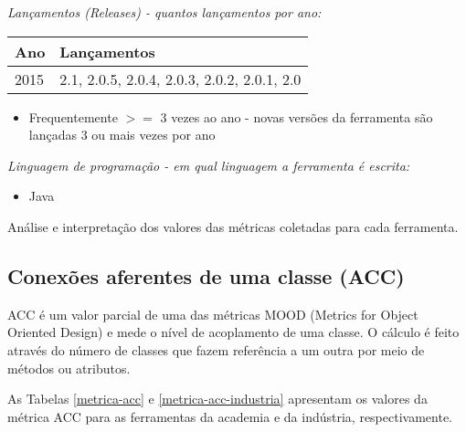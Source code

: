 \begin{description}

  \item {\it Lançamentos ({\it Releases}) - quantos lançamentos por ano:}
    \begin{table}[h!]
      \centering
      \begin{tabular}{| l | l |}
        \hline
        Ano  & Lançamentos                                 \\
        \hline
        2015 & 2.1, 2.0.5, 2.0.4, 2.0.3, 2.0.2, 2.0.1, 2.0 \\
        \hline
      \end{tabular}
    \end{table}
    \begin{itemize}
      \item Frequentemente $>=$ 3 vezes ao ano - novas versões da ferramenta são lançadas 3 ou mais vezes por ano
    \end{itemize}

  \item {\it Linguagem de programação - em qual linguagem a ferramenta é escrita:}
    \begin{itemize}
      \item Java
    \end{itemize}

\end{description}

{Análise e interpretação dos valores das métricas coletadas para cada ferramenta.}
\label{analise-metricas}

\subsection{Conexões aferentes de uma classe (ACC)}

ACC é um valor parcial de uma das métricas MOOD (Metrics for Object Oriented
Design) \cite{Brito1994} e mede o nível de acoplamento de uma classe. O
cálculo é feito através do número de classes que fazem referência a um outra
por meio de métodos ou atributos.

As Tabelas \ref{metrica-acc} e \ref{metrica-acc-industria} apresentam os
valores da métrica ACC para as ferramentas da academia e da indústria,
respectivamente.


